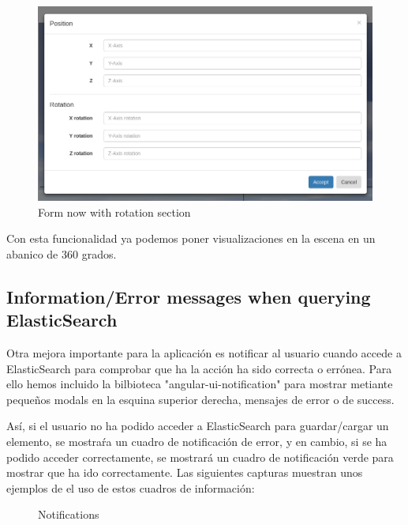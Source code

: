 \documentclass[a4paper, 12pt]{book}
\begin{document}
\begin{figure}[H]
  \centering
  \includegraphics[width=16cm, keepaspectratio]{img/development/newformaframedc}
  \caption{Form now with rotation section}
  \label{fig:examplestandalone}
\end{figure}

Con esta funcionalidad ya podemos poner visualizaciones en la escena en un abanico de 360 grados.

\subsection{Information/Error messages when querying ElasticSearch}

Otra mejora importante para la aplicación es notificar al usuario cuando accede a ElasticSearch para comprobar que ha la acción ha sido correcta o errónea. Para ello hemos incluido la bilbioteca "angular-ui-notification" para mostrar metiante pequeños modals en la esquina superior derecha, mensajes de error o de success.

Así, si el usuario no ha podido acceder a ElasticSearch para guardar/cargar un elemento, se mostraŕa un cuadro de notificación de error, y en cambio, si se ha podido acceder correctamente, se mostrará un cuadro de notificación verde para mostrar que ha ido correctamente. Las siguientes capturas muestran unos ejemplos de el uso de estos cuadros de información:

\begin{figure}[H]
 \centering
 \caption{Notifications}
 \label{f:threedcexamples}
\end{figure}
\end{document}
